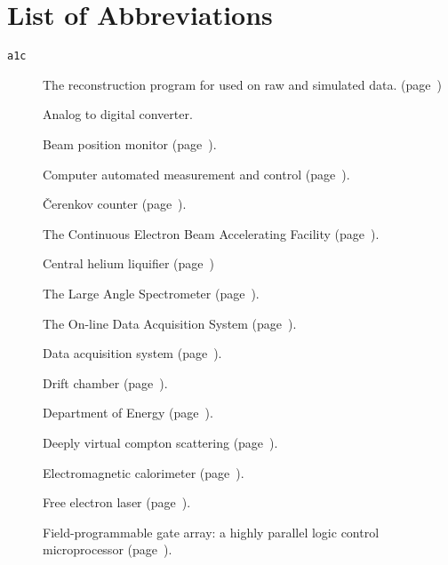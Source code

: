 \chapter{\label{sec:app.abbr}List of Abbreviations}

\newcommand{\pr}[1]{(page~\pageref{#1})}

\begin{description}

    \item[\texttt{a1c}] The reconstruction program for  used on raw and simulated data. \pr{abbr:a1c}
    \item[] Analog to digital converter.

    \item[] Beam position monitor \pr{abbr:bpm}.

    \item[] Computer automated measurement and control \pr{abbr:camac}.
    \item[] \v{C}erenkov counter \pr{sec:clas.cc}.
    \item[] The Continuous Electron Beam Accelerating Facility \pr{abbr:cebaf}.
    \item[] Central helium liquifier \pr{abbr:chl}
    \item[] The  Large Angle Spectrometer \pr{abbr:clas}.
    \item[] The  On-line Data Acquisition System \pr{abbr:coda}.

    \item[] Data acquisition system \pr{sec:clas.daq}.
    \item[] Drift chamber \pr{sec:clas.dc}.
    \item[] Department of Energy \pr{abbr:doe}.
    \item[] Deeply virtual compton scattering \pr{abbr:dvcs}.

    \item[] Electromagnetic calorimeter \pr{sec:clas.ec}.

    \item[] Free electron laser \pr{abbr:fel}.
    \item[] Field-programmable gate array: a highly parallel logic control microprocessor \pr{abbr:fpga}.


\end{description}
